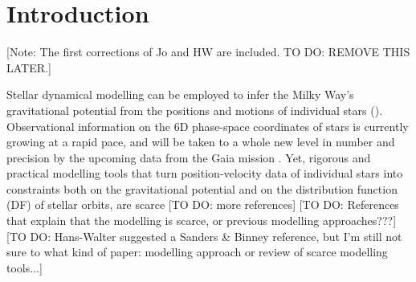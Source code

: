\section{Introduction} \label{sec:intro}

[Note: The first corrections of Jo and HW are included. TO DO: REMOVE THIS LATER.]

Stellar dynamical modelling can be employed to infer the Milky Way's gravitational potential from the positions and motions of individual stars (\citealt{bin08,bin11b,rix13}). Observational information on the 6D phase-space coordinates of stars is currently growing at a rapid pace, and will be taken to a whole new level in number and precision by the upcoming data from the Gaia mission \citep{2001A&A...369..339P}. Yet, rigorous and practical modelling tools that turn position-velocity data of individual stars into constraints both on the gravitational potential and on the distribution function (DF) of stellar orbits, are scarce \citep{rix13} [TO DO: more references] [TO DO: References that explain that the modelling is scarce, or previous modelling approaches???] [TO DO: Hans-Walter suggested a Sanders \& Binney reference, but I'm still not sure to what kind of paper: modelling approach or review of scarce modelling tools...]







